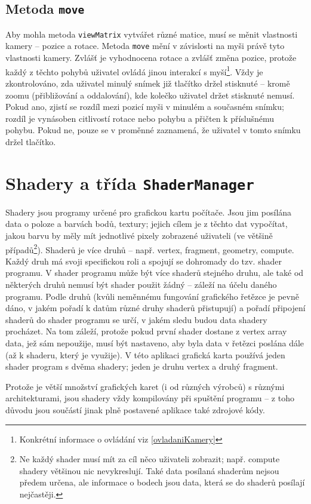 \documentclass[a4paper, 11pt]{report}
\begin{document}
\subsection{Metoda \texttt{move}}
Aby mohla metoda \texttt{viewMatrix} vytvářet různé matice, musí se měnit vlastnosti kamery -- pozice a rotace. Metoda \texttt{move} mění v závislosti na myši právě tyto vlastnosti kamery. Zvlášť je vyhodnocena rotace a zvlášť změna pozice, protože každý z těchto pohybů uživatel ovládá jinou interakcí s myší\footnote{Konkrétní informace o ovládání viz \ref{ovladaniKamery}}. Vždy je zkontrolováno, zda uživatel minulý snímek již tlačítko držel stisknuté -- kromě zoomu (přibližování a oddalování), kde kolečko uživatel držet stisknuté nemusí. Pokud ano, zjistí se rozdíl mezi pozicí myši v minulém a současném snímku; rozdíl je vynásoben citlivostí rotace nebo pohybu a přičten k příslušnému pohybu. Pokud ne, pouze se v proměnné zaznamená, že uživatel v tomto snímku držel tlačítko.

\section{\label{shadery}Shadery a třída \texttt{ShaderManager}}
Shadery jsou programy určené pro grafickou kartu počítače. Jsou jim posílána data o poloze a barvách bodů, textury; jejich cílem je z těchto dat vypočítat, jakou barvu by měly mít jednotlivé pixely zobrazené uživateli (ve většině případů\footnote{Ne každý shader musí mít za cíl něco uživateli zobrazit; např. compute shadery většinou nic nevykreslují. Také data posílaná shaderům nejsou předem určena, ale informace o bodech jsou data, která se do shaderů posílají nejčastěji.}). Shaderů je více druhů -- např. vertex, fragment, geometry, compute. Každý druh má svoji specifickou roli a spojují se dohromady do tzv. shader programu. V shader programu může být více shaderů stejného druhu, ale také od některých druhů nemusí být shader použit žádný -- záleží na účelu daného programu. Podle druhů (kvůli neměnnému fungování grafického řetězce je pevně dáno, v jakém pořadí k datům různé druhy shaderů přistupují) a pořadí připojení shaderů do shader programu se určí, v jakém sledu budou data shadery procházet. Na tom záleží, protože pokud první shader dostane z vertex array data, jež sám nepoužije, musí být nastaveno, aby byla data v řetězci poslána dále (až k shaderu, který je využije). V této aplikaci grafická karta používá jeden shader program s dvěma shadery; jeden je druhu vertex a druhý fragment.

Protože je větší množství grafických karet (i od různých výrobců) s různými architekturami, jsou shadery vždy kompilovány při spuštění programu -- z toho důvodu jsou součástí jinak plně postavené aplikace také zdrojové kódy.
\end{document}

